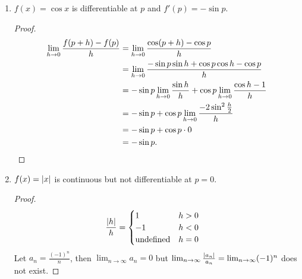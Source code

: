 \begin{example}
\begin{enumerate}[label=(\alph*)]
        \item $f(x) = \cos x$ is differentiable at $p$ and $f'(p) = - \sin p$.
        \begin{proof}
            \begin{align*}
                \lim_{h \to 0} \frac{f(p + h) - f(p)}{h} &= \lim_{h \to 0} \frac{\cos(p + h) - \cos p}{h} \\
                &= \lim_{h \to 0} \frac{- \sin p \sin h + \cos p \cos h - \cos p}{h} \\
                &= - \sin p \lim_{h \to 0} \frac{\sin h}{h} + \cos p \lim_{h \to 0} \frac{\cos h - 1}{h} \\
                &= - \sin p + \cos p \lim_{h \to 0} \frac{-2 \sin^{2} \frac{h}{2}}{h} \\
                &= - \sin p + \cos p \cdot 0 \\
                &= - \sin p. \qedhere
            \end{align*}
        \end{proof}

        \item $f(x) = \abs{x}$ is continuous but not differentiable at $p = 0$.
        \begin{proof}
            \begin{align*}
                \frac{\abs{h}}{h} &= \begin{cases}
                    1 & h > 0 \\
                    -1 & h < 0 \\
                    \text{undefined} & h = 0
                \end{cases}
            \end{align*}
            Let $a_{n} = \frac{(-1)^{n}}{n}$, then $\lim_{n \to \infty} a_{n} = 0$ but $\lim_{n \to \infty} \frac{\abs{a_{n}}}{a_{n}} = \lim_{n \to \infty} (-1)^{n}$ does not exist.
        \end{proof}
    \end{enumerate}
\end{example}
